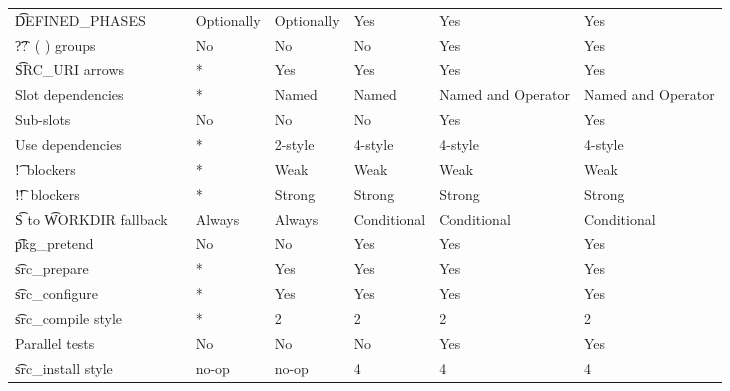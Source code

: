 \begin{landscape}
\begin{longtable}{llP{7.5em}P{7.5em}P{7.5em}P{7.5em}P{7.5em}}
\t{DEFINED\_PHASES} &  &
    Optionally & Optionally & Yes & Yes & Yes \\

\t{??\ ( )} groups &  &
    No & No & No & Yes & Yes \\

\t{SRC\_URI} arrows &  &
    * & Yes & Yes & Yes & Yes \\

Slot dependencies &  &
    * & Named & Named & Named and Operator & Named and Operator \\

Sub-slots &  &
    No & No & No & Yes & Yes \\

Use dependencies &  &
    * & 2-style & 4-style & 4-style & 4-style \\

\t{!}\ blockers &  &
    * & Weak & Weak & Weak & Weak \\

\t{!!}\ blockers &  &
    * & Strong & Strong & Strong & Strong \\

\t{S} to \t{WORKDIR} fallback &  &
    Always & Always & Conditional & Conditional & Conditional \\

\t{pkg\_pretend} &  &
    No & No & Yes & Yes & Yes \\

\t{src\_prepare} &  &
    * & Yes & Yes & Yes & Yes \\

\t{src\_configure} &  &
    * & Yes & Yes & Yes & Yes \\

\t{src\_compile} style &  &
    * & 2 & 2 & 2 & 2 \\

Parallel tests &  &
    No & No & No & Yes & Yes \\

\t{src\_install} style &  &
    no-op & no-op & 4 & 4 & 4 \\


\end{longtable}
\end{landscape}
